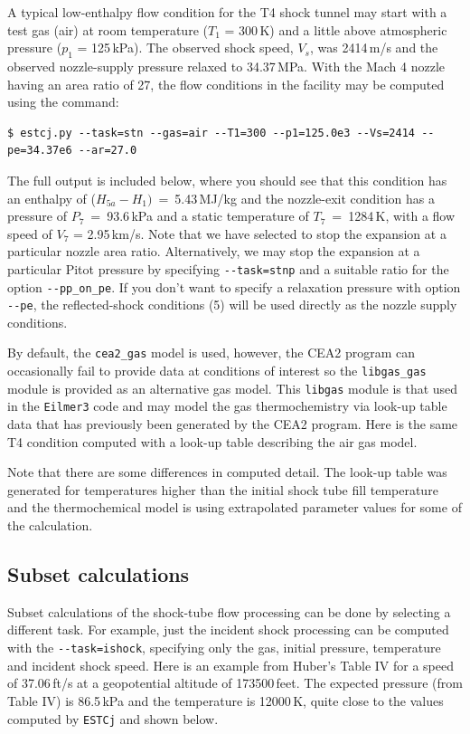 \documentclass[landscape,12pt,a4paper]{article}
\begin{document}
\medskip
A typical low-enthalpy flow condition for the T4 shock tunnel may start with
a test gas (air) at room temperature ($T_1$ = 300\,K) 
and a little above atmospheric pressure ($p_1$ = 125\,kPa).
The observed shock speed, $V_s$, was 2414\,m/s and the observed nozzle-supply pressure
relaxed to 34.37\,MPa.
With the Mach 4 nozzle having an area ratio of 27, the flow conditions in the facility
may be computed using the command:
\begin{verbatim}
$ estcj.py --task=stn --gas=air --T1=300 --p1=125.0e3 --Vs=2414 --pe=34.37e6 --ar=27.0
\end{verbatim}
The full output is included below, where you should see that
this condition has an enthalpy of ($H_{5a} - H_1)$~=~5.43\,MJ/kg and the nozzle-exit condition
has a pressure of $P_7$~=~93.6\,kPa and a static temperature of $T_7$~=~1284\,K,
with a flow speed of $V_7$ = 2.95\,km/s.
Note that we have selected to stop the expansion at a particular nozzle area ratio.
Alternatively, we may stop the expansion at a particular Pitot pressure by specifying
\verb?--task=stnp? and a suitable ratio for the option \verb?--pp_on_pe?.
If you don't want to specify a relaxation pressure with option \verb?--pe?,
the reflected-shock conditions (5) will be used directly as the nozzle supply conditions.



\medskip
By default, the \verb!cea2_gas! model is used, however, the CEA2 program can occasionally fail
to provide data at conditions of interest so the \verb!libgas_gas! module is provided 
as an alternative gas model.
This \verb!libgas! module is that used in the \verb!Eilmer3! code and may model the gas 
thermochemistry via look-up table data that has previously been generated by the CEA2 program. 
Here is the same T4 condition computed with a look-up table describing the air gas model.



Note that there are some differences in computed detail.  
The look-up table was generated for temperatures higher than the initial shock tube 
fill temperature and the thermochemical model is using extrapolated parameter values 
for some of the calculation.

\subsection{Subset calculations}
%
Subset calculations of the shock-tube flow processing can be done by selecting a different task.
For example, just the incident shock processing can be computed with the \verb?--task=ishock?,
specifying only the gas, initial pressure, temperature and incident shock speed.
Here is an example from Huber's \cite{huber_1963a} Table IV for a speed of 37.06\,ft/s 
at a geopotential altitude of 173500\,feet.
The expected pressure (from Table IV) is 86.5\,kPa and the temperature is 12000\,K,
quite close to the values computed by \verb!ESTCj! and shown below.
\end{document}

